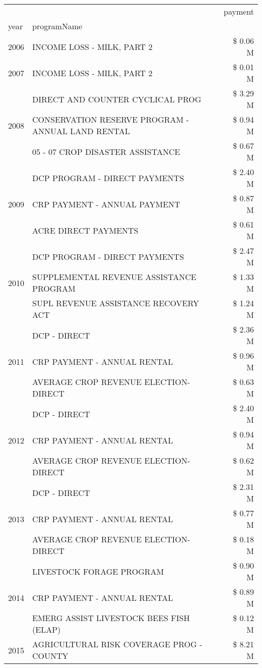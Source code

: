 \begin{tabular}{llr}
\toprule
 &  & payment \\
year & programName &  \\
\midrule
2006 & INCOME LOSS - MILK, PART 2 & \$ 0.06 M \\
\cline{1-3}
2007 & INCOME LOSS - MILK, PART 2 & \$ 0.01 M \\
\cline{1-3}
\multirow[t]{3}{*}{2008} & DIRECT AND COUNTER CYCLICAL PROG & \$ 3.29 M \\
 & CONSERVATION RESERVE PROGRAM - ANNUAL LAND RENTAL & \$ 0.94 M \\
 & 05 - 07 CROP DISASTER ASSISTANCE & \$ 0.67 M \\
\cline{1-3}
\multirow[t]{3}{*}{2009} & DCP PROGRAM - DIRECT PAYMENTS & \$ 2.40 M \\
 & CRP PAYMENT - ANNUAL PAYMENT & \$ 0.87 M \\
 & ACRE DIRECT PAYMENTS & \$ 0.61 M \\
\cline{1-3}
\multirow[t]{3}{*}{2010} & DCP PROGRAM - DIRECT PAYMENTS & \$ 2.47 M \\
 & SUPPLEMENTAL REVENUE ASSISTANCE PROGRAM & \$ 1.33 M \\
 & SUPL REVENUE ASSISTANCE RECOVERY ACT & \$ 1.24 M \\
\cline{1-3}
\multirow[t]{3}{*}{2011} & DCP - DIRECT & \$ 2.36 M \\
 & CRP PAYMENT - ANNUAL RENTAL & \$ 0.96 M \\
 & AVERAGE CROP REVENUE ELECTION-DIRECT & \$ 0.63 M \\
\cline{1-3}
\multirow[t]{3}{*}{2012} & DCP - DIRECT & \$ 2.40 M \\
 & CRP PAYMENT - ANNUAL RENTAL & \$ 0.94 M \\
 & AVERAGE CROP REVENUE ELECTION-DIRECT & \$ 0.62 M \\
\cline{1-3}
\multirow[t]{3}{*}{2013} & DCP - DIRECT & \$ 2.31 M \\
 & CRP PAYMENT - ANNUAL RENTAL & \$ 0.77 M \\
 & AVERAGE CROP REVENUE ELECTION-DIRECT & \$ 0.18 M \\
\cline{1-3}
\multirow[t]{3}{*}{2014} & LIVESTOCK FORAGE PROGRAM & \$ 0.90 M \\
 & CRP PAYMENT - ANNUAL RENTAL & \$ 0.89 M \\
 & EMERG ASSIST LIVESTOCK BEES FISH (ELAP) & \$ 0.12 M \\
\cline{1-3}
\multirow[t]{3}{*}{2015} & AGRICULTURAL RISK COVERAGE PROG - COUNTY & \$ 8.21 M \\

\end{tabular}
